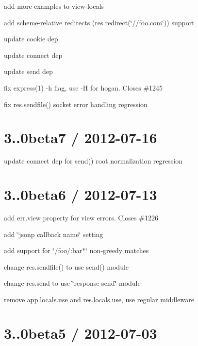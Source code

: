 \begin{DoxyItemize}
\item add more examples to view-\/locals
\item add scheme-\/relative redirects ({\ttfamily res.\+redirect(\char`\"{}//foo.\+com\char`\"{})}) support
\item update cookie dep
\item update connect dep
\item update send dep
\item fix {\ttfamily express(1)} -\/h flag, use -\/\+H for hogan. Closes \#1245
\item fix {\ttfamily res.\+sendfile()} socket error handling regression
\end{DoxyItemize}

\section*{3..\+0beta7 / 2012-\/07-\/16 }


\begin{DoxyItemize}
\item update connect dep for {\ttfamily send()} root normalization regression
\end{DoxyItemize}

\section*{3..\+0beta6 / 2012-\/07-\/13 }


\begin{DoxyItemize}
\item add {\ttfamily err.\+view} property for view errors. Closes \#1226
\item add \char`\"{}jsonp callback name\char`\"{} setting
\item add support for \char`\"{}/foo/\+:bar$\ast$\char`\"{} non-\/greedy matches
\item change {\ttfamily res.\+sendfile()} to use {\ttfamily send()} module
\item change {\ttfamily res.\+send} to use \char`\"{}response-\/send\char`\"{} module
\item remove {\ttfamily app.\+locals.\+use} and {\ttfamily res.\+locals.\+use}, use regular middleware
\end{DoxyItemize}

\section*{3..\+0beta5 / 2012-\/07-\/03 }


